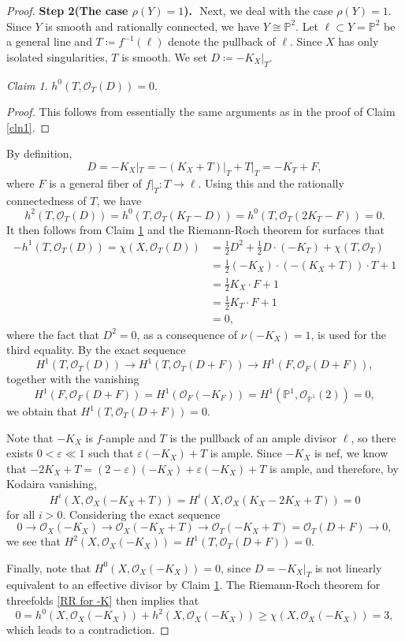 \documentclass[12pt]{amsart}
\def\epsilon{\varepsilon}
\newcommand{\PP}{\mathbb{P}}
\newcommand{\sO}{\mathcal{O}}
\theoremstyle{plain}
\theoremstyle{definition}
\theoremstyle{remark}
\newtheorem{defn and notation}[thm]{Definition and Notation}
\newtheorem{cln}{Claim}
\theoremstyle{plain}
\begin{document}
\begin{proof}
    \textbf{Step 2(The case $\rho(Y)=1$).}\,\,
    Next, we deal with the case $\rho(Y)=1$.
    Since $Y$ is smooth and rationally connected, we have $Y\cong\PP^2$.
    Let $\ell \subset Y=\PP^2$ be a general line and $T\coloneqq f^{-1}(\ell)$ denote the pullback of $\ell$. 
    Since $X$ has only isolated singularities, $T$ is smooth. 
    We set $D\coloneqq -K_X|_T$.
    
    \begin{cln}\label{cln2}
        $h^0(T,\sO_T(D))=0$.
    \end{cln}
    \begin{proof}
    This follows from essentially the same arguments as in the proof of Claim \ref{cln1}. 
    \end{proof}

    By definition, 
    \[
    D=-K_X|_T=-(K_X+T)|_T+T|_T=-K_T+F,
    \]
    where $F$ is a general fiber of $f|_T:T \to \ell$. 
    Using this and the rationally connectedness of $T$, we have
    \[
    h^2(T,\sO_T(D))=h^0(T,\sO_T(K_T-D))=h^0(T,\sO_T(2K_T-F))=0.
    \]
It then follows from Claim \ref{cln2} and the Riemann-Roch theorem for surfaces that 
    \begin{align*}
        -h^1(T,\sO_T(D))=\chi(X,\sO_T(D))&=\frac{1}{2}D^2+\frac{1}{2}D\cdot(-K_T)+\chi(T, \sO_T)\\
        &=\frac{1}{2}(-K_X)\cdot (-(K_X+T)) \cdot T+1\\
        &=\frac{1}{2}K_X\cdot F+1\\
        &=\frac{1}{2}K_T \cdot F +1\\
        &=0, 
    \end{align*}
    where the fact that $D^2=0$, as a consequence of $\nu(-K_X)=1$, is used for the third equality.
By the exact sequence
\[
H^1(T,\sO_T(D)) \to H^1(T, \sO_T(D+F))\to H^1(F, \sO_F(D+F)),
\]
together with the vanishing 
\[
H^1(F, \sO_F(D+F))=H^1(\sO_F(-K_F))=H^1(\PP^1, \sO_{\PP^1}(2))=0,
\]
we obtain that $H^1(T,\sO_T(D+F))=0$.

Note that $-K_X$ is $f$-ample and $T$ is the pullback of an ample divisor $\ell$, so there exists $0<\epsilon\ll 1$ such that $\epsilon (-K_X)+T$ is ample.
Since $-K_X$ is nef, we know that $-2K_X+T=(2-\epsilon)(-K_X)+\epsilon(-K_X)+T$ is ample, and therefore, by Kodaira vanishing, 
    \[
    H^i(X,\sO_X(-K_X+T))=H^i(X, \sO_X(K_X-2K_X+T))=0
    \]
    for all $i>0$.
    Considering the exact sequence
    \[
    0\to \sO_X(-K_X)\to \sO_X(-K_X+T) \to \sO_T(-K_X+T)=\sO_T(D+F)\to 0,
    \]
    we see that $H^2(X, \sO_X(-K_X))=H^1(T,\sO_T(D+F))=0$.
    
Finally, note that $H^0(X,\sO_X(-K_X))=0$, since $D=-K_X|_T$ is not linearly equivalent to an effective divisor by Claim \ref{cln2}. 
The Riemann-Roch theorem for threefolds \eqref{RR for -K} then implies that  
    \[
    0=h^0(X,\sO_X(-K_X))+h^2(X,\sO_X(-K_X))\geq \chi(X,\sO_X(-K_X))=3,
    \]
which leads to a contradiction.
    \end{proof}
    
\end{document}
